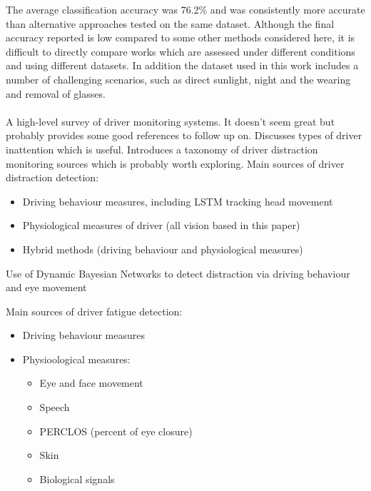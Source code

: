 \documentclass[11pt, parskip=half*,twoside=false]{scrbook}
\begin{document}
The average classification accuracy was 76.2\% and was consistently more accurate than alternative approaches tested on the same dataset. Although the final accuracy reported is low compared to some other methods considered here, it is difficult to directly compare works which are assessed under different conditions and using different datasets. In addition the dataset used in this work includes a number of challenging scenarios, such as direct sunlight, night and the wearing and removal of glasses.

\paragraph{\citet{trutschelPERCLOSAlertnessMeasure2011}}

\paragraph{\citet{gaoEEGBasedSpatioTemporal2019}} 

\paragraph{\citep{koesdwiadyRecentTrendsDriver2017}} A high-level survey of driver monitoring systems. It doesn't seem great but probably provides some good references to follow up on. Discusses types of driver inattention which is useful. Introduces a taxonomy of driver distraction monitoring sources which is probably worth exploring. Main sources of driver distraction detection:
\begin{itemize}
	\item Driving behaviour measures, including LSTM tracking head movement \citep{wollmerOnlineDriverDistraction2011}
	\item Physiological measures of driver (all vision based in this paper)
	\item Hybrid methods (driving behaviour and physiological measures)
\end{itemize}

Use of Dynamic Bayesian Networks to detect distraction via driving behaviour and eye movement \citep{liangHybridBayesianNetwork2014}

Main sources of driver fatigue detection:
\begin{itemize}
	\item Driving behaviour measures
	\item Physioological measures:
	\begin{itemize}
		\item Eye and face movement
		\item Speech
		\item PERCLOS (percent of eye closure)
		\item Skin \citep{kurianDrowsinessDetectionUsing2014a}
		\item Biological signals \citep{zhangAutomatedDetectionDriver2014}
	\end{itemize}
\end{itemize}
\end{document}

